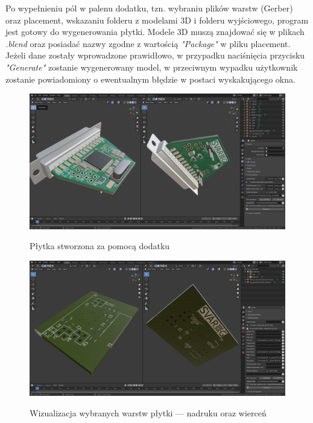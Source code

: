 \documentclass{xmgr}
\begin{document}
\newpage





Po wypełnieniu pól w palenu dodatku, tzn. wybraniu plików warstw (Gerber) oraz placement, wskazaniu folderu z modelami 3D i folderu wyjściowego, program jest gotowy do wygenerowania płytki. Modele 3D muszą znajdować się w plikach \emph{.blend} oraz posiadać nazwy zgodne z wartością \emph{"Package"} w pliku placement. Jeżeli dane zostały wprowadzone prawidłowo, w przypadku naciśnięcia przycisku \emph{"Generate"} zostanie wygenerowany model, w przeciwnym wypadku użytkownik zostanie powiadomiony o ewentualnym błędzie w postaci wyskakującego okna. 

\begin{figure}
\centering
\includegraphics[width=1\hsize]{fig/addon_generated}
\caption{Płytka stworzona za pomocą dodatku}
 \label{img3}
\end{figure}

\begin{figure}
\centering
\includegraphics[width=1\hsize]{fig/addon_selective_render}
\caption{Wizualizacja wybranych warstw płytki --- nadruku oraz wierceń}
 \label{img3}
\end{figure}
\end{document}

